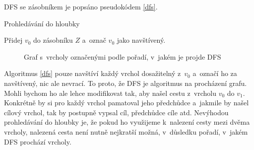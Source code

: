 \documentclass[12pt]{report}			%
\begin{document}
DFS se zásobníkem je popsáno pseudokódem \ref{dfs}.
\begin{algorithm}

			    \caption{Prohledávání do hloubky}
			    \label{dfs}
  				Přidej $v_0$ do zásobníku $Z$ a~označ $v_0$ jako navštívený.
  				
				
				
				\end{algorithm}
\begin{figure}[h]
\begin{center}
\caption{Graf s~vrcholy označenými podle pořadí, v~jakém je projde DFS} \label{grafDFS}
\end{center}
\end{figure}
			Algoritmus \ref{dfs} pouze navštíví každý vrchol dosažitelný z~$v_0$ a~označí ho za navštívený, nic ale nevrací. To proto, že DFS je algoritmus na procházení grafu. Mohli bychom ho ale lehce modifikovat tak, aby našel cestu z~vrcholu $v_0$ do $v_1$. Konkrétně by si pro každý vrchol pamatoval jeho předchůdce a~jakmile by našel cílový vrchol, tak by postupně vypsal cíl, předchůdce cíle atd. Nevýhodou prohledávání do hloubky je, že pokud ho využijeme k~nalezení cesty mezi dvěma vrcholy, nalezená cesta není nutně nejkratší možná, v~důsledku pořadí, v~jakém DFS prochází vrcholy.
			
\end{document}
